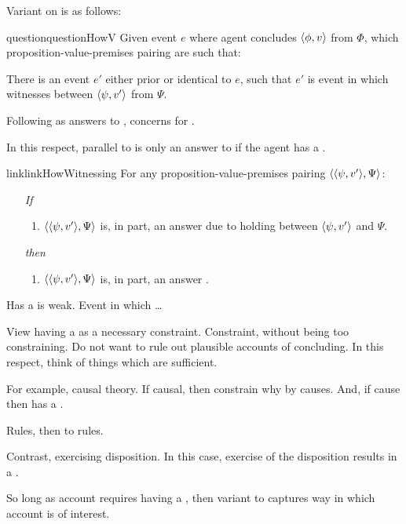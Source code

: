 \begin{note}
  Variant on \qHow{} is as follows:

  \begin{restatable}[\qHowV{}]{question}{questionHowV}
    \label{q:how:v}
    Given event \(e\) where agent concludes \(\langle \phi, v \rangle\) from \(\Phi\), which proposition-value-premises pairing are such that:

    There is an event \(e'\) either prior or identical to \(e\), such that \(e'\) is event in which \vAgent{} witnesses \support{} between \(\langle \psi, v' \rangle\) from \(\Psi\).
  \end{restatable}

  Following  as answers to \qWhyVnP{}, \qHowV{} concerns  for .

  In this respect, parallel to \issueInclusion{}
  \ros{} is only an answer to \qWhyVnP{} if the agent has a \wit{}.
\end{note}

\begin{note}
  \begin{restatable}{link}{linkHowWitnessing}
    \label{link:how-witnessing}
    For any proposition-value-premises pairing \(\langle \langle \psi, v' \rangle, \Psi \rangle\):
    \begin{itemize}
    \item[\emph{If}]
      \begin{enumerate}[label=\alph*., ref=(\alph*)]
      \item
        \(\langle \langle \psi, v' \rangle, \Psi \rangle\) is, in part, an answer \qHow{} due to \support{} holding between \(\langle \psi, v' \rangle\) and \(\Psi\).
      \end{enumerate}
    \item[\emph{then}]
      \begin{enumerate}[label=\alph*., ref=(\alph*), resume]
      \item
        \(\langle \langle \psi, v' \rangle, \Psi \rangle\) is, in part, an answer \qHowV{}.
      \end{enumerate}
    \end{itemize}
    \vspace{-\baselineskip}
  \end{restatable}
\end{note}

\begin{note}
  Has a  is weak.
  Event in which \dots

  View having a  as a necessary constraint.
  Constraint, without being too constraining.
  Do not want to rule out plausible accounts of concluding.
  In this respect, think of things which are sufficient.

  For example, causal theory.
  If causal, then constrain why by causes.
  And, if cause then has a .

  Rules, then  to rules.

  Contrast, exercising disposition.
  In this case, exercise of the disposition results in a .

  So long as account requires having a , then variant to \qHow{} captures way in which account is of interest.
\end{note}

